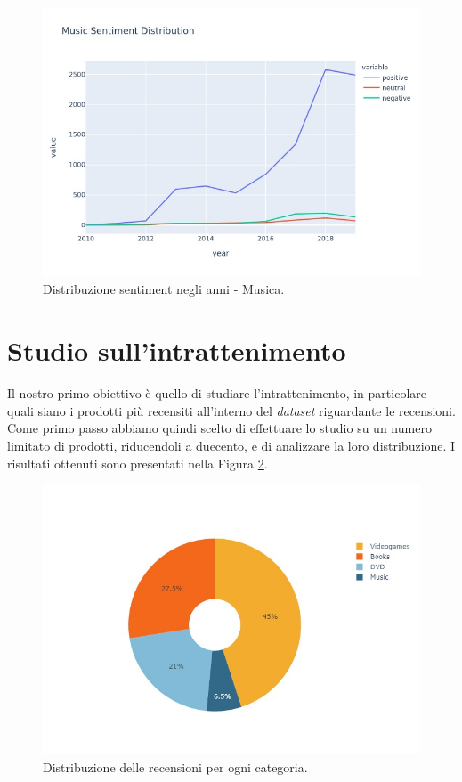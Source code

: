 				\begin{figure} [h]
					\includegraphics[width=\textwidth]{Figure/sent_year_music}
					\caption{Distribuzione sentiment negli anni - Musica.}
					\label{fig:sent_year_music}
				\end{figure}
			
		
	\section{Studio sull'intrattenimento}
		Il nostro primo obiettivo è quello di studiare l'intrattenimento, in particolare quali siano i prodotti più recensiti all'interno del \textit{dataset} riguardante le recensioni. Come primo passo abbiamo  quindi scelto di effettuare lo studio su un numero limitato di prodotti, riducendoli a duecento, e di analizzare la loro distribuzione. I risultati ottenuti sono presentati nella Figura \ref{fig:pie_category}. 
			
		\begin{figure} [h]
			\includegraphics[width=\textwidth]{Figure/pie_category}	
			\caption{Distribuzione delle recensioni per ogni categoria.}
			\label{fig:pie_category}
		\end{figure}
		
